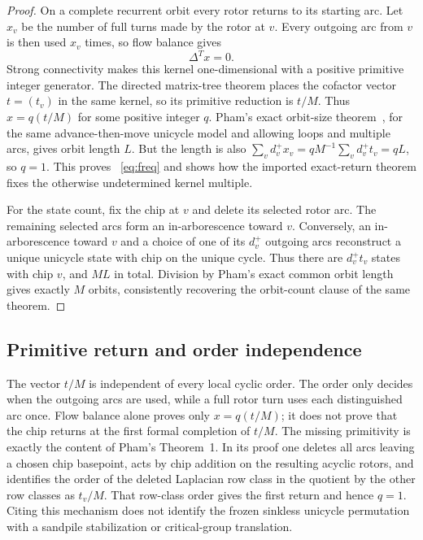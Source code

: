 \documentclass[10pt]{article}
\begin{document}
\begin{proof}
On a complete recurrent orbit every rotor returns to its starting arc.  Let
$x_v$ be the number of full turns made by the rotor at $v$.  Every outgoing
arc from $v$ is then used $x_v$ times, so flow balance gives
\[
 \Delta^Tx=0.
\]
Strong connectivity makes this kernel one-dimensional with a positive
primitive integer generator.  The directed matrix-tree theorem places the
cofactor vector $t=(t_v)$ in the same kernel, so its primitive reduction is
$t/M$.  Thus $x=q(t/M)$ for some positive integer $q$.  Pham's exact
orbit-size theorem~\cite[Theorem~1]{pham}, for the same advance-then-move
unicycle model and allowing loops and multiple arcs, gives orbit length $L$.
But the length is also
$\sum_vd_v^+x_v=qM^{-1}\sum_vd_v^+t_v=qL$, so $q=1$.  This proves
~\eqref{eq:freq} and shows how the imported exact-return theorem fixes the
otherwise undetermined kernel multiple.

For the state count, fix the chip at $v$ and delete its selected rotor arc.
The remaining selected arcs form an in-arborescence toward $v$.  Conversely,
an in-arborescence toward $v$ and a choice of one of its $d_v^+$ outgoing
arcs reconstruct a unique unicycle state with chip on the unique cycle.
Thus there are $d_v^+t_v$ states with chip $v$, and $ML$ in total.  Division
by Pham's exact common orbit length gives exactly $M$ orbits, consistently
recovering the orbit-count clause of the same theorem.
\end{proof}

\subsection*{Primitive return and order independence}
The vector $t/M$ is independent of every local cyclic order.  The order only
decides when the outgoing arcs are used, while a full rotor turn uses each
distinguished arc once.  Flow balance alone proves only $x=q(t/M)$; it does
not prove that the chip returns at the first formal completion of $t/M$.
The missing primitivity is exactly the content of Pham's Theorem~1.  In its
proof one deletes all arcs leaving a chosen chip basepoint, acts by chip
addition on the resulting acyclic rotors, and identifies the order of the
deleted Laplacian row class in the quotient by the other row classes as
$t_v/M$.  That row-class order gives the first return and hence $q=1$.
Citing this mechanism does not identify the frozen sinkless unicycle
permutation with a sandpile stabilization or critical-group translation.
\end{document}
